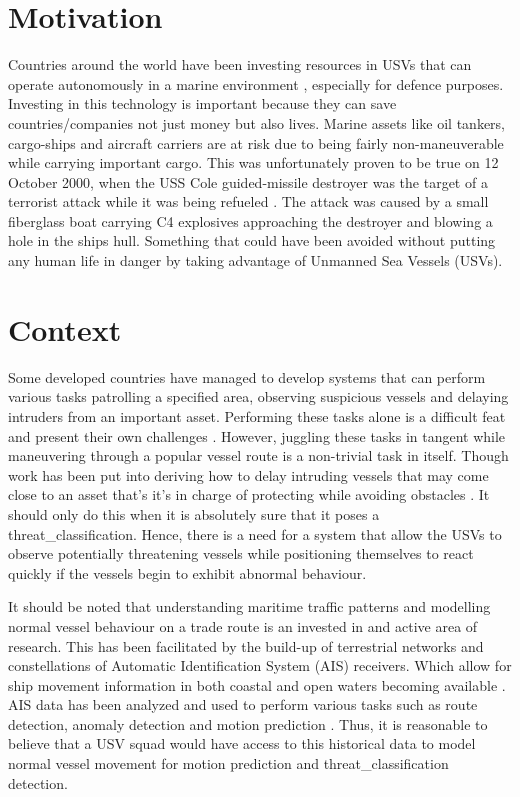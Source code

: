 \documentclass[bsc,frontabs,twoside,singlespacing,parskip,deptreport]{infthesis}     %
\begin{document}
\section{Motivation}
Countries around the world have been investing resources in USVs that can operate autonomously in a marine environment \cite{usvcase}, especially for defence purposes.  Investing in this technology is important because they can save countries/companies not just money but also lives. Marine assets like oil tankers, cargo-ships and aircraft carriers are at risk due to being fairly non-maneuverable while carrying important cargo. This was unfortunately proven to be true on 12 October 2000, when the USS Cole guided-missile destroyer was the target of a terrorist attack while it was being refueled \cite{combs2009encyclopedia}. The attack was caused by a small fiberglass boat carrying C4 explosives approaching the destroyer and blowing a hole in the ships hull. Something that could have been avoided without putting any human life in danger by taking advantage of Unmanned Sea Vessels (USVs). 

\section{Context}
Some developed countries have managed to develop systems that can perform various tasks patrolling a specified area, observing suspicious vessels and delaying intruders from an important asset. Performing these tasks alone is a difficult feat and present their own challenges \cite{usvcase}\cite{wolf2017caracas}\cite{raboin2013model}. However, juggling these tasks in tangent while maneuvering through a popular vessel route is a non-trivial task in itself. Though work has been put into deriving how to delay intruding vessels that may come close to an asset that's it's in charge of protecting \cite{raboin2013model} while avoiding obstacles \cite{gupta2015block}\cite{marzoughi2018collision}. It should only do this when it is absolutely sure that it poses a threat_classification. Hence, there is a need for a system that allow the USVs to observe potentially threatening vessels while positioning themselves to react quickly if the vessels begin to exhibit abnormal behaviour.

It should be noted that understanding maritime traffic patterns and modelling normal vessel behaviour on a trade route is an invested in and active area of research. This has been facilitated by the build-up of terrestrial networks and constellations of Automatic Identification System (AIS) receivers. Which allow for ship movement information in both coastal and open waters becoming available \cite{perez2009automatic}. AIS data has been analyzed and used to perform various tasks such as route detection, anomaly detection and motion prediction\cite{pallotta2013vessel} \cite{ristic2008statistical} \cite{kowalska2012maritime}.  
Thus, it is reasonable to believe that a USV squad would have access to this historical data to model normal vessel movement for motion prediction and threat_classification detection.
\end{document}
